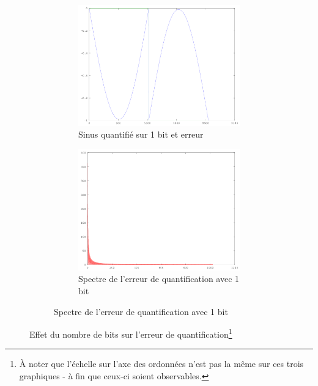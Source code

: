 \documentclass{article}
\begin{document}
\begin{figure}[h!]
\begin{subfigure}[b]{\textwidth}
\begin{subfigure}[b]{.45\textwidth}
			\label{fig:q_4b}
		\end{subfigure}
	\end{subfigure}
	\\
	\begin{subfigure}[b]{\textwidth}
		\begin{subfigure}[b]{.45\textwidth}
			\centering
			\includegraphics[width=\textwidth]{err_quantif_1bit_t}
			\caption{Sinus quantifié sur 1 bit et erreur}
			\label{fig:q_1a}
		\end{subfigure}
		\hfill
		\begin{subfigure}[b]{.45\textwidth}
			\centering
			\includegraphics[width=\textwidth]{err_quantif_1bit_f}
			\caption{Spectre de l'erreur de quantification avec 1 bit}
			\label{fig:q_1b}
		\end{subfigure}
	\end{subfigure}	
	\caption{Effet du nombre de bits sur l'erreur de quantification\footnote{À noter que l'échelle sur l'axe des ordonnées n'est pas la même sur ces trois graphiques - à fin que ceux-ci soient observables.}}
\end{figure}
\end{document}
